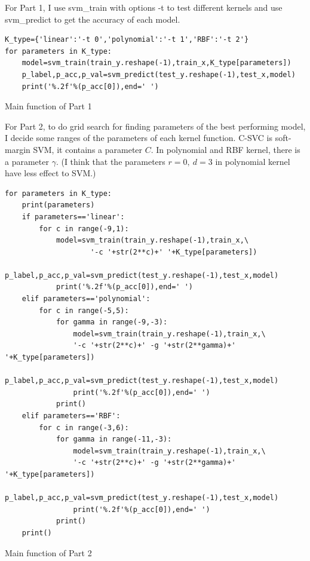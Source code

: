 \documentclass{article}
\begin{document}
For Part 1, I use svm\_train with options -t to test different kernels and use svm\_predict to get the accuracy of each model.
\begin{listing}[!ht]
\begin{verbatim}
K_type={'linear':'-t 0','polynomial':'-t 1','RBF':'-t 2'}
for parameters in K_type:
    model=svm_train(train_y.reshape(-1),train_x,K_type[parameters])
    p_label,p_acc,p_val=svm_predict(test_y.reshape(-1),test_x,model)
    print('%.2f'%(p_acc[0]),end=' ')
\end{verbatim}
\caption{Main function of Part 1}
\label{listing}
\end{listing}

For Part 2, to do grid search for finding parameters of the best performing model, I decide some ranges of the parameters of each kernel function. C-SVC is soft-margin SVM, it contains a parameter $C$. In polynomial and RBF kernel, there is a parameter $\gamma$. (I think that the parameters $r=0,\ d=3$ in polynomial kernel have less effect to SVM.)

\begin{listing}[!ht]
\begin{verbatim}
for parameters in K_type:
    print(parameters)
    if parameters=='linear':
        for c in range(-9,1):
            model=svm_train(train_y.reshape(-1),train_x,\
                    '-c '+str(2**c)+' '+K_type[parameters])
            p_label,p_acc,p_val=svm_predict(test_y.reshape(-1),test_x,model)
            print('%.2f'%(p_acc[0]),end=' ')
    elif parameters=='polynomial':
        for c in range(-5,5):
            for gamma in range(-9,-3):
                model=svm_train(train_y.reshape(-1),train_x,\
                '-c '+str(2**c)+' -g '+str(2**gamma)+' '+K_type[parameters])
                p_label,p_acc,p_val=svm_predict(test_y.reshape(-1),test_x,model)
                print('%.2f'%(p_acc[0]),end=' ')
            print()
    elif parameters=='RBF':
        for c in range(-3,6):
            for gamma in range(-11,-3):
                model=svm_train(train_y.reshape(-1),train_x,\
                '-c '+str(2**c)+' -g '+str(2**gamma)+' '+K_type[parameters])
                p_label,p_acc,p_val=svm_predict(test_y.reshape(-1),test_x,model)
                print('%.2f'%(p_acc[0]),end=' ')
            print()
    print()
\end{verbatim}
\caption{Main function of Part 2}
\label{listing}
\end{listing}
\end{document}

